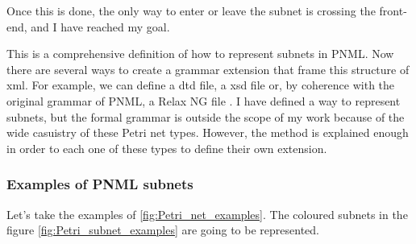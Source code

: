Once this is done, the only way to enter or leave the subnet is crossing
the front-end, and I have reached my goal.

This is a comprehensive definition of how to represent subnets in PNML. Now
there are several ways to create a grammar extension that frame this structure
of xml. For example, we can define a dtd file\cite{PNML-dtd}, a xsd file
\cite{PNML-xsd1,PNML-xsd2} or, by coherence with the original grammar of PNML, a Relax NG file \cite{PNML-relaxng.org}. I have defined a way to represent subnets, but the formal grammar is outside the scope of my work because of the wide casuistry of these Petri net types.
However, the method is explained enough in order to each one of these types to define their own extension. 

 

\subsubsection{Examples of PNML subnets}

Let's take the examples of \ref{fig:Petri_net_examples}. The coloured subnets in the figure \ref{fig:Petri_subnet_examples}  are going to be represented.

